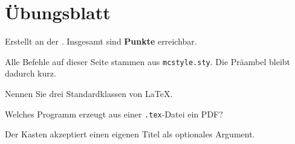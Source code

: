 \documentclass[a4paper,11pt]{article}
\begin{document}
\section*{Übungsblatt}
Erstellt an der \fh{}. Insgesamt sind \textbf{\gesamtpunkte{} Punkte} erreichbar.

\begin{hinweis}
  Alle Befehle auf dieser Seite stammen aus \texttt{mcstyle.sty}.
  Die Präambel bleibt dadurch kurz.
\end{hinweis}

Nennen Sie drei Standardklassen von \LaTeX. 

Welches Programm erzeugt aus einer \texttt{.tex}-Datei ein PDF?

\begin{hinweis}[Tipp]
  Der Kasten akzeptiert einen eigenen Titel als optionales Argument.
\end{hinweis}
\end{document}
